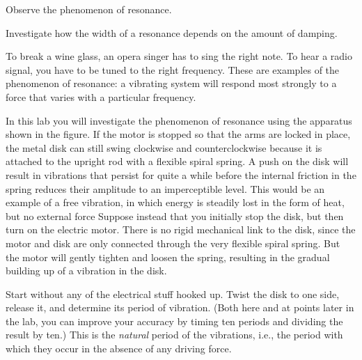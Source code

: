 \label{resonancelab}\label{lab:resonance}

\apparatus
{}

\begin{goals}

\item[] Observe the phenomenon of resonance.

\item[] Investigate how the width of a resonance depends on
the amount of damping.
\end{goals}

\introduction

To break a wine glass, an opera singer has to sing the right
note. To hear a radio signal, you have to be tuned to the
right frequency. These are examples of the phenomenon of
resonance: a vibrating system will respond most strongly to
a force that varies with a particular frequency.


\apparatus
In this lab you will investigate the phenomenon of resonance
using the apparatus shown in the figure. If the motor is
stopped so that the arms are locked in place, the metal disk
can still swing clockwise and counterclockwise because it is
attached to the upright rod with a flexible spiral spring. A
push on the disk will result in vibrations that persist for
quite a while before the internal friction in the spring
reduces their amplitude to an imperceptible level. This
would be an example of a free vibration, in which energy is
steadily lost in the form of heat, but no external force
Suppose instead that you initially stop the disk, but then
turn on the electric motor. There is no rigid mechanical
link to the disk, since the motor and disk are only
connected through the very flexible spiral spring. But the
motor will gently tighten and loosen the spring, resulting
in the gradual building up of a vibration in the disk.

\observations


Start without any of the electrical stuff hooked up. Twist
the disk to one side, release it, and determine its period
of vibration. (Both here and at points later in the lab, you
can improve your accuracy by timing ten periods and dividing
the result by ten.) This is the \emph{natural} period of the
vibrations, i.e., the period with which they occur in the
absence of any driving force.

